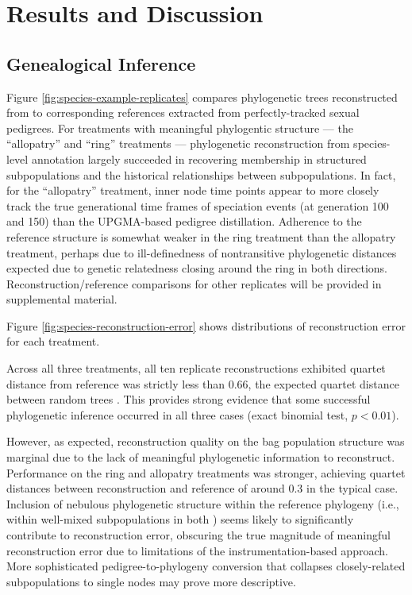 \section{Results and Discussion} \label{sec:results}

\subsection{Genealogical Inference}



Figure \ref{fig:species-example-replicates} compares phylogenetic trees reconstructed from to corresponding references extracted from perfectly-tracked sexual pedigrees.
For treatments with meaningful phylogentic structure --- the ``allopatry'' and ``ring'' treatments --- phylogenetic reconstruction from species-level annotation largely succeeded in recovering membership in structured subpopulations and the historical relationships between subpopulations.
In fact, for the ``allopatry'' treatment, inner node time points appear to more closely track the true generational time frames of speciation events (at generation 100 and 150) than the UPGMA-based pedigree distillation.
Adherence to the reference structure is somewhat weaker in the ring treatment than the allopatry treatment, perhaps due to ill-definedness of nontransitive phylogenetic distances expected due to genetic relatedness closing around the ring in both directions.
Reconstruction/reference comparisons for other replicates will be provided in supplemental material.



Figure \ref{fig:species-reconstruction-error} shows distributions of reconstruction error for each treatment.

Across all three treatments, all ten replicate reconstructions exhibited quartet distance from reference was strictly less than 0.66, the expected quartet distance between random trees \citep{smith2020information}.
This provides strong evidence that some successful phylogenetic inference occurred in all three cases (exact binomial test, $p < 0.01$).

However, as expected, reconstruction quality on the bag population structure was marginal due to the lack of meaningful phylogenetic information to reconstruct.
Performance on the ring and allopatry treatments was stronger, achieving quartet distances between reconstruction and reference of around 0.3 in the typical case.
Inclusion of nebulous phylogenetic structure within the reference phylogeny (i.e., within well-mixed subpopulations in both ) seems likely to significantly contribute to reconstruction error, obscuring the true magnitude of meaningful reconstruction error due to limitations of the instrumentation-based approach.
More sophisticated pedigree-to-phylogeny conversion that collapses closely-related subpopulations to single nodes may prove more descriptive.

